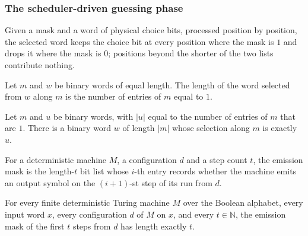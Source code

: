 \subsubsection{The scheduler-driven guessing phase}

\begin{definition}
\label{Complexity.contSelect}
\leanok
Given a mask and a word of physical choice bits, processed position by position, the selected word keeps the choice bit at every position where the mask is $1$ and drops it where the mask is $0$; positions beyond the shorter of the two lists contribute nothing.
\end{definition}

\begin{lemma}
\label{Complexity.cont_select_length}
\leanok
{}
Let $m$ and $w$ be binary words of equal length. The length of the word selected from
$w$ along $m$ is the number of entries of $m$ equal to $1$.
\end{lemma}

\begin{lemma}
\label{Complexity.cont_select_surjective}
\leanok
{}
Let $m$ and $u$ be binary words, with $|u|$ equal to the number of entries of $m$ that
are $1$. There is a binary word $w$ of length $|m|$ whose selection along $m$ is exactly
$u$.
\end{lemma}

\begin{definition}
\label{Complexity.contEmissionMask}
\leanok
{}
For a deterministic machine $M$, a configuration $d$ and a step count $t$, the emission mask is the length-$t$ bit list whose $i$-th entry records whether the machine emits an output symbol on the $(i+1)$-st step of its run from $d$.
\end{definition}

\begin{lemma}
\label{Complexity.cont_mask_length}
\leanok
{}
For every finite deterministic Turing machine $M$ over the Boolean alphabet, every input
word $x$, every configuration $d$ of $M$ on $x$, and every $t \in \mathbb{N}$, the
emission mask of the first $t$ steps from $d$ has length exactly $t$.
\end{lemma}

